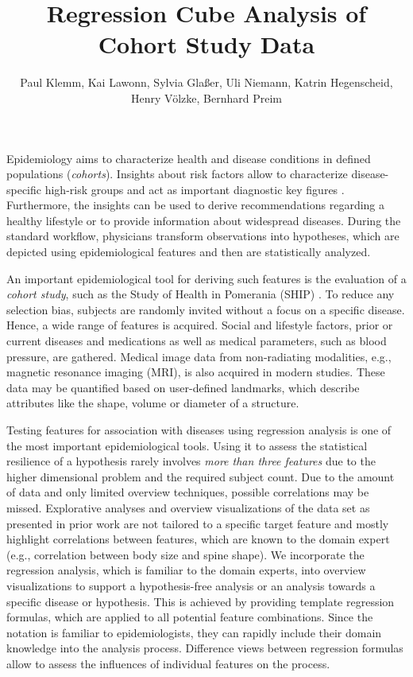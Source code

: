 \documentclass[journal]{style/vgtc} 			          %
\title{Regression Cube Analysis of Cohort Study Data}
\author{Paul Klemm, Kai Lawonn, Sylvia Gla{\ss}er, Uli Niemann, Katrin Hegenscheid, Henry V{\"o}lzke, Bernhard Preim}
\begin{document}


\maketitle
Epidemiology aims to characterize health and disease conditions in defined populations (\emph{cohorts}).
Insights about risk factors allow to characterize disease-specific high-risk groups and act as important diagnostic key figures \cite{Fletcher2012}.
Furthermore, the insights can be used to derive recommendations regarding a healthy lifestyle or to provide information about widespread diseases.
During the standard workflow, physicians transform observations into hypotheses, which are depicted using epidemiological features and then are statistically analyzed.

An important epidemiological tool for deriving such features is the evaluation of a \emph{cohort study}, such as the Study of Health in Pomerania (SHIP) \cite{Volzke2011}.
To reduce any selection bias, subjects are randomly invited without a focus on a specific disease.
Hence, a wide range of features is acquired.
%
Social and lifestyle factors, prior or current diseases and medications as well as medical parameters, such as blood pressure, are gathered.
Medical image data from non-radiating modalities, e.g., magnetic resonance imaging (MRI), is also acquired in modern studies.
These data may be quantified based on user-defined landmarks, which describe attributes like the shape, volume or diameter of a structure.

Testing features for association with diseases using regression analysis is one of the most important epidemiological tools.
Using it to assess the statistical resilience of a hypothesis rarely involves \emph{more than three features} due to the higher dimensional problem and the required subject count.
Due to the amount of data and only limited overview techniques, possible correlations may be missed.
Explorative analyses and overview visualizations of the data set as presented in prior work \cite{Klemm2014VIS} are not tailored to a specific target feature and mostly highlight correlations between features, which are known to the domain expert (e.g., correlation between body size and spine shape).
We incorporate the regression analysis, which is familiar to the domain experts, into overview visualizations to support a hypothesis-free analysis or an analysis towards a specific disease or hypothesis.
This is achieved by providing template regression formulas, which are applied to all potential feature combinations.
Since the notation is familiar to epidemiologists, they can rapidly include their domain knowledge into the analysis process.
Difference views between regression formulas allow to assess the influences of individual features on the process.
\end{document}

